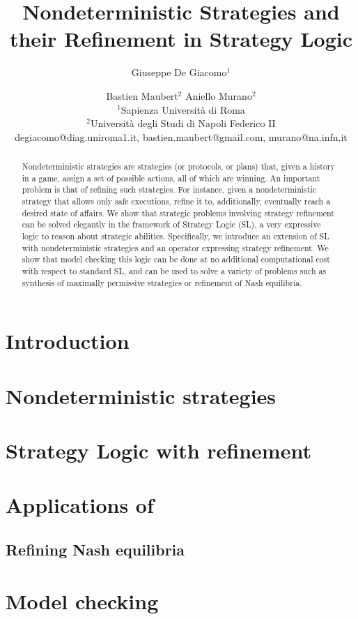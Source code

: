 \documentclass{article}
\title{Nondeterministic Strategies and their Refinement in Strategy Logic}
\author{
 Giuseppe De Giacomo$^1$\and
 Bastien Maubert$^2$\And
  Aniello Murano$^2$\\
 	\affiliations
 	$^1$Sapienza Università di Roma\\
 	$^2$Universit\`a degli Studi di Napoli Federico II\\
 	\emails
 	degiacomo@diag.uniroma1.it,
 	bastien.maubert@gmail.com,
 	murano@na.infn.it
}
\theoremstyle{definition}
\theoremstyle{plain}
\begin{document}
\maketitle

\begin{abstract}
  Nondeterministic strategies are strategies (or protocols, or plans)
  that, given a history in a game, assign a set of possible actions,
  all of which are winning.  An important problem is that of refining
  such strategies. For instance, given a nondeterministic strategy
  that allows only safe executions, refine it to, additionally,
  eventually reach a desired state of affairs. We show that strategic
  problems involving strategy refinement can be solved elegantly in the framework of Strategy Logic
  (SL), a very expressive logic to reason about strategic
  abilities. Specifically, we introduce an extension of SL with
  nondeterministic strategies and an operator expressing  strategy refinement. We
  show that model checking this logic can be done at no additional
  computational cost with respect to standard SL, and can be used to
  solve a variety of problems such as  synthesis of maximally permissive
  strategies or
  refinement of Nash equilibria.
\end{abstract}

\section{Introduction}
\label{section:introduction}


\section{Nondeterministic strategies}
\label{section:refinement}






\section{Strategy Logic with refinement}
\label{section:SL}



% 


\section{Applications of \SLref}
\label{section:synthesis}



\subsection{Refining Nash equilibria}
\label{section:nash}


\section{Model checking \SLref}
\label{section:mc}




\end{document}
